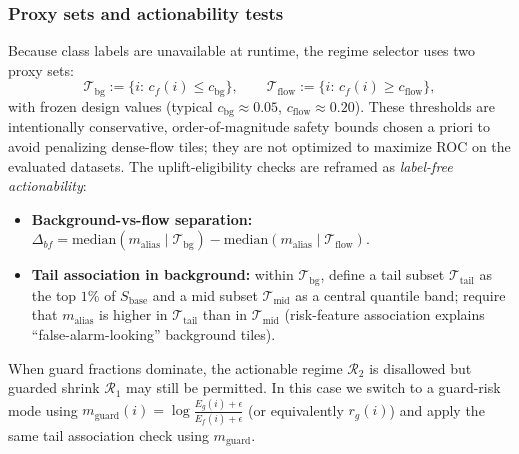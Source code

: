 \subsubsection{Proxy sets and actionability tests}
Because class labels are unavailable at runtime, the regime selector uses two proxy sets:
\[
\mathcal{T}_{\mathrm{bg}}:=\{i:\,c_f(i)\le c_{\mathrm{bg}}\},\qquad
\mathcal{T}_{\mathrm{flow}}:=\{i:\,c_f(i)\ge c_{\mathrm{flow}}\},
\]
with frozen design values (typical $c_{\mathrm{bg}}\approx 0.05$, $c_{\mathrm{flow}}\approx 0.20$). These thresholds are intentionally conservative, order-of-magnitude safety bounds chosen a priori to avoid penalizing dense-flow tiles; they are not optimized to maximize ROC on the evaluated datasets. The uplift-eligibility checks are reframed as \emph{label-free actionability}:
\begin{itemize}[nosep]
  \item \textbf{Background-vs-flow separation:} $\Delta_{bf}=\mathrm{median}(m_{\mathrm{alias}}\mid\mathcal{T}_{\mathrm{bg}})-\mathrm{median}(m_{\mathrm{alias}}\mid\mathcal{T}_{\mathrm{flow}})$.
  \item \textbf{Tail association in background:} within $\mathcal{T}_{\mathrm{bg}}$, define a tail subset $\mathcal{T}_{\mathrm{tail}}$ as the top $1\%$ of $S_{\mathrm{base}}$ and a mid subset $\mathcal{T}_{\mathrm{mid}}$ as a central quantile band; require that $m_{\mathrm{alias}}$ is higher in $\mathcal{T}_{\mathrm{tail}}$ than in $\mathcal{T}_{\mathrm{mid}}$ (risk-feature association explains ``false-alarm-looking'' background tiles).
\end{itemize}
When guard fractions dominate, the actionable regime $\mathcal{R}_2$ is disallowed but guarded shrink $\mathcal{R}_1$ may still be permitted. In this case we switch to a guard-risk mode using $m_{\mathrm{guard}}(i)=\log\frac{E_g(i)+\epsilon}{E_f(i)+\epsilon}$ (or equivalently $r_g(i)$) and apply the same tail association check using $m_{\mathrm{guard}}$.

